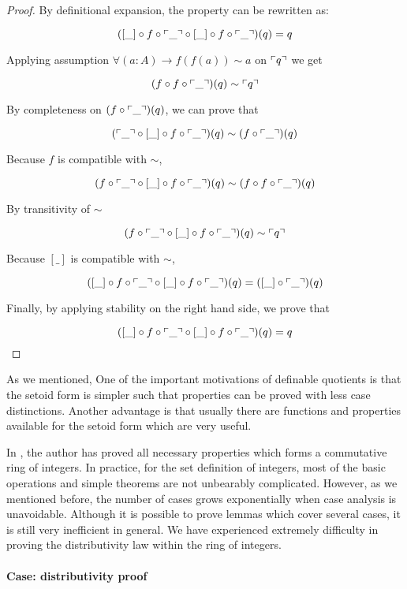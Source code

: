 \begin{proof}
By definitional expansion, the property can be rewritten as:

$$([\_] \circ f \circ \ulcorner\_\urcorner \circ [\_] \circ f \circ \ulcorner\_\urcorner)(q) = q$$

Applying assumption $\forall (a : A) \to f (f (a)) \sim a$ on $\ulcorner q\urcorner$ we get

$$(f \circ f \circ \ulcorner\_\urcorner) (q) \sim \ulcorner q\urcorner$$

By completeness on $(f \circ \ulcorner\_\urcorner) (q)$, we can prove that

$$ (\ulcorner\_\urcorner \circ [\_] \circ f \circ \ulcorner\_\urcorner) (q) \sim  (f \circ \ulcorner\_\urcorner) (q) $$

Because $f$ is compatible with $\sim$,

$$ (f \circ \ulcorner\_\urcorner \circ [\_] \circ  f \circ \ulcorner\_\urcorner) (q) \sim  (f \circ f \circ \ulcorner\_\urcorner) (q) $$

By transitivity of $\sim$

$$(f \circ \ulcorner\_\urcorner \circ [\_] \circ  f \circ \ulcorner\_\urcorner) (q) \sim \ulcorner q\urcorner$$


Because $[\_]$ is compatible with $\sim$,


$$([\_] \circ f \circ \ulcorner\_\urcorner \circ [\_] \circ f \circ \ulcorner\_\urcorner) (q) = ([\_] \circ \ulcorner\_\urcorner)(q)$$

Finally, by applying stability on the right hand side, we prove that


$$([\_] \circ f \circ \ulcorner\_\urcorner \circ [\_] \circ f \circ \ulcorner\_\urcorner)(q) = q$$
\end{proof}


As we mentioned, One of the important motivations of definable quotients is that the setoid form is simpler such that properties can be proved with less case distinctions. Another advantage is that usually there are functions and properties available for the setoid form which are very useful. 

In \cite{finalyear}, the author has proved all necessary properties which forms a commutative ring of integers.
In practice, for the set definition of integers, most of the basic operations and simple theorems are not unbearably complicated. However, as we mentioned before, the number of
cases grows exponentially when case analysis is unavoidable.
Although it is possible to prove lemmas which cover several cases, it is still very inefficient in general. We have experienced extremely difficulty in proving the distributivity law within the ring of integers.

\paragraph{Case: distributivity proof}

